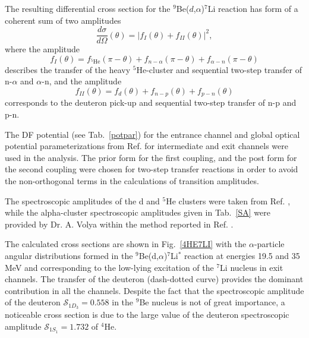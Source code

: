 \documentclass[10pt]{iopart}
\begin{document}
The resulting differential cross section for the ${^9}$Be($d$,$\alpha$)${}^7$Li reaction has form of a coherent sum of two amplitudes
\begin{equation}
\frac{d\sigma}{d\Omega}(\theta) =\vert f_{I}(\theta) + f_{II}(\theta) \vert ^2,
\end{equation}
where the amplitude
\begin{equation} \label{eq:ampl1}
f_{I}(\theta)=f_{{}^5\textrm{He}}(\pi - \theta) + f_{n-\alpha}(\pi - \theta) + f_{\alpha-n}(\pi - \theta)
\end{equation}
describes the transfer of the heavy ${}^5$He-cluster and sequential two-step transfer of n-$\alpha$ and $\alpha$-n, and the amplitude
\begin{equation} \label{eq:ampl2}
f_{II}(\theta)=f_{d}(\theta) + f_{n-p}( \theta) + f_{p-n}(\theta)
\end{equation}
corresponds to the deuteron pick-up and sequential two-step transfer of n-p and p-n.

The DF potential (see Tab.~\ref{potpar}) for the entrance channel and global optical potential parameterizations from Ref. \cite{globalTriton, globalAlpha, global6Li} for intermediate and exit channels were used in the analysis.
The prior form for the first coupling, and the post form for the second coupling were chosen for two-step transfer reactions in order to avoid the non-orthogonal terms in the calculations of transition amplitudes.


The spectroscopic amplitudes of the d and ${}^5$He clusters were taken from Ref. \cite{fiveSA}, while the alpha-cluster spectroscopic amplitudes given in Tab.~\ref{SA} were provided by Dr. A. Volya within the method reported in Ref. \cite{volya2017}.

The calculated cross sections are shown in Fig.~\ref{4HE7LI} with the $\alpha$-particle angular distributions formed in the ${}^9$Be(d,$\alpha$)${}^7$Li$^*$ reaction at energies 19.5 and 35 MeV and corresponding to the low-lying excitation of the ${}^7$Li nucleus in exit channels. The transfer of the deuteron (dash-dotted curve) provides the dominant contribution in all the channels. Despite the fact that the spectroscopic amplitude of the deuteron $\mathcal{S}_{1{D}_3}=0.558$ in the ${}^9$Be nucleus is not of great importance, a noticeable cross section is due to the large value of the deuteron spectroscopic amplitude $\mathcal{S}_{1{S}_1}=1.732$  of ${}^4$He.
\end{document}
